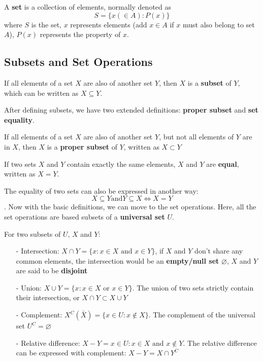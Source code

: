 A \textbf{set} is a collection of elements, normally denoted as
$$
S = \{x (\in A):P(x)\}
$$
where $S$ is the set, $x$ represents elements (add $x\in A$ if $x$ must also belong to set $A$), $P(x)$ represents the property of $x$.

\subsection{Subsets and Set Operations}
\begin{definition}
    If all elements of a set $X$ are also of another set $Y$, then $X$ is a \textbf{subset} of $Y$, which can be written as $X\subseteq Y$.
\end{definition}

After defining subsets, we have two extended definitions: \textbf{proper subset} and \textbf{set equality}.
\begin{definition}
    If all elements of a set $X$ are also of another set $Y$, but not all elements of $Y$ are in $X$, then $X$ is a \textbf{proper subset} of $Y$, written as $X \subset Y$
\end{definition}
\begin{definition}
    If two sets $X$ and $Y$ contain exactly the same elements, $X$ and $Y$ are \textbf{equal}, written as $X=Y$.
\end{definition}

The equality of two sets can also be expressed in another way: $$ X\subseteq Y \text{and} Y\subseteq X \Leftrightarrow X=Y$$.
Now with the basic definitions, we can move to the set operations. Here, all the set operations are based subsets of a \textbf{universal set} $U$.
\begin{definition}
    For two subsets of $U$, $X$ and $Y$:
    \begin{enumerate}
        \item[-] Intersection: $X\cap Y=\{x:x\in X \text{ and } x\in Y\}$, if $X$ and $Y$ don't share any common elements, the intersection would be 
        an \textbf{empty/null set} $\varnothing$, $X$ and $Y$ are said to be \textbf{disjoint}
        \item[-] Union: $X\cup Y = \{x:x\in X \text{ or } x\in Y \}$. The union of two sets strictly contain their intersection, or $X\cap Y \subset X\cup Y$
        \item[-] Complement: $X^C(\bar{X}) = \{x\in U:x\notin X\}$. The complement of the universal set $U^C=\varnothing$
        \item[-] Relative difference: $X-Y = {x\in U:x\in X \text{ and } x\notin Y}$. The relative difference can be expressed with complement: $X-Y = X\cap Y^C$
    \end{enumerate}
\end{definition}